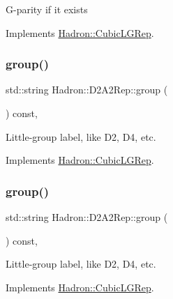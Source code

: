 G-\/parity if it exists 

Implements \mbox{\hyperlink{structHadron_1_1CubicLGRep_ace26f7b2d55e3a668a14cb9026da5231}{Hadron\+::\+Cubic\+L\+G\+Rep}}.

\mbox{\label{structHadron_1_1D2A2Rep_a8e9ca89445c95fe1a83b73d4eeddf68b}} 
\subsubsection{\texorpdfstring{group()}{group()}\hspace{0.1cm}{\footnotesize\ttfamily [1/5]}}
{\footnotesize\ttfamily std\+::string Hadron\+::\+D2\+A2\+Rep\+::group (\begin{DoxyParamCaption}{ }\end{DoxyParamCaption}) const\hspace{0.3cm}{\ttfamily [inline]}, {\ttfamily [virtual]}}

Little-\/group label, like D2, D4, etc. 

Implements \mbox{\hyperlink{structHadron_1_1CubicLGRep_a9bdb14b519a611d21379ed96a3a9eb41}{Hadron\+::\+Cubic\+L\+G\+Rep}}.

\mbox{\label{structHadron_1_1D2A2Rep_a8e9ca89445c95fe1a83b73d4eeddf68b}} 
\subsubsection{\texorpdfstring{group()}{group()}\hspace{0.1cm}{\footnotesize\ttfamily [2/5]}}
{\footnotesize\ttfamily std\+::string Hadron\+::\+D2\+A2\+Rep\+::group (\begin{DoxyParamCaption}{ }\end{DoxyParamCaption}) const\hspace{0.3cm}{\ttfamily [inline]}, {\ttfamily [virtual]}}

Little-\/group label, like D2, D4, etc. 

Implements \mbox{\hyperlink{structHadron_1_1CubicLGRep_a9bdb14b519a611d21379ed96a3a9eb41}{Hadron\+::\+Cubic\+L\+G\+Rep}}.

\mbox{\label{structHadron_1_1D2A2Rep_a8e9ca89445c95fe1a83b73d4eeddf68b}} 
